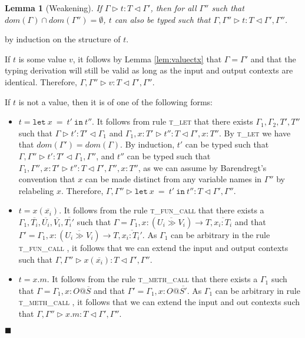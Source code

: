 \documentclass[preprint]{sigplanconf}
\newtheorem{lem}{Lemma}
\newcommand{\lemref}[1]{Lemma \ref{#1}}
\newcommand{\tlet}{\textsc{t\_let} }
\newcommand{\tfunc}{\textsc{t\_fun\_call} }
\newcommand{\tmethc}{\textsc{t\_meth\_call} }
\newcommand{\typerule}[4]{#1 \triangleright #2 : #3 \triangleleft #4}
\newcommand{\lett}[3]{\mathtt{let}\:#1\:\mathtt{=}\:#2\:\mathtt{in}\:#3}
\newcommand{\qed}{$\blacksquare$}
\newenvironment{proof}{\vspace{1ex}\noindent{\bf Proof}\hspace{0.5em}}
  {\hfill\qed\vspace{1ex}}
\begin{document}
\begin{lem}[Weakening]
\label{lem:weakening}
If $\typerule{\Gamma}{t}{T}{\Gamma'}$,
then for all $\Gamma''$ such that $dom(\Gamma) \cap dom(\Gamma'') = \emptyset$,
$t$ can also be typed such that
$\typerule{\Gamma, \Gamma''}{t}{T}{\Gamma', \Gamma''}$.
\end{lem}
\begin{proof}
by induction on the structure of $t$.

If $t$ is some value $v$, it follows by \lemref{lem:valuectx} that 
$\Gamma = \Gamma'$ and that the typing derivation will still be valid as long
as the input and output contexts are identical. Therefore,
$\typerule{\Gamma , \Gamma''}{v}{T}{\Gamma', \Gamma''}$.

If $t$ is not a value, then it is of one of the following forms:

\begin{itemize}
\item $t = \lett{x}{t'}{t''}$. It follows from rule \tlet that
there exists $\Gamma_1, \Gamma_2, T', T''$ such that
$\typerule{\Gamma}{t'}{T'}{\Gamma_1}$ and
$\typerule{\Gamma_1, x : T'}{t''}{T}{\Gamma', x : T''}$.
By \tlet we have that $dom(\Gamma') = dom(\Gamma)$.
By induction, $t'$ can be typed such
that $\typerule{\Gamma,\Gamma''}{t'}{T'}{\Gamma_1,\Gamma''}$,
and $t''$ can be typed such that
$\typerule{\Gamma_1, \Gamma'', x : T'}{t''}{T}{\Gamma', \Gamma'', x : T''}$,
as we can assume by Barendregt's convention that $x$ can be made distinct from
any variable names in $\Gamma''$ by relabeling $x$.
Therefore,
$\typerule{\Gamma, \Gamma''}{\lett{x}{t'}{t''}}{T}{\Gamma', \Gamma''}$.

\item $t = x ( \overline{x_i} )$. It follows from the rule \tfunc that
there exists a $\Gamma_1, \overline{T_i}, \overline{U_i}, \overline{V_i}, \overline{T_i'}$ 
such that 
$\Gamma = \Gamma_1, x : (\overline{U_i \gg V_i}) \rightarrow T, \overline{x_i : T_i}$
and that
$\Gamma' = \Gamma_1, x : (\overline{U_i \gg V_i}) \rightarrow T, \overline{x_i : T_i'}$.
As $\Gamma_1$ can be arbitrary in the rule \tfunc, it follows that we
can extend the input and output contexts such that
$\typerule{\Gamma, \Gamma''}{x ( \overline{x_i} )}{T}{\Gamma', \Gamma''}$.

\item $t = x.m$. It follows from the rule \tmethc that there exists
a $\Gamma_1$ such that $\Gamma = \Gamma_1, x : O@\overline{S}$ and that 
$\Gamma' = \Gamma_1, x : O@\overline{S'}$.
As $\Gamma_1$ can be arbitrary in rule \tmethc, it follows that we can
extend the input and out contexts such that
$\typerule{\Gamma, \Gamma''}{x.m}{T}{\Gamma', \Gamma''}$.


\end{itemize}
\end{proof}
\end{document}
